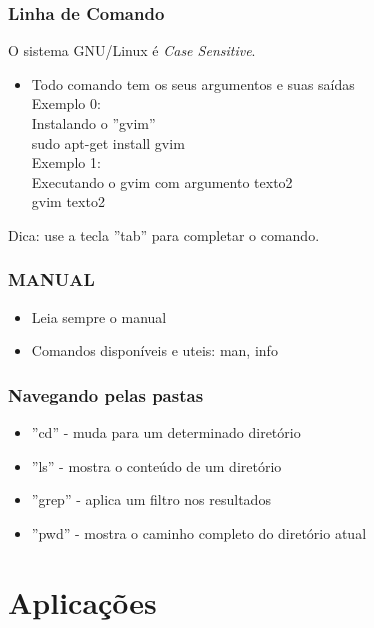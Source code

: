 \documentclass{beamer}
\begin{document}
\begin{frame}   
    \frametitle{Linha de Comando}

    O sistema GNU/Linux é \textit{Case Sensitive}.

    \begin{itemize}
        \item Todo comando tem os seus argumentos e suas saídas\\
            Exemplo 0:\\
            Instalando o ''gvim''\\
            sudo apt-get install gvim\\
            Exemplo 1: \\
            Executando o gvim com argumento texto2 \\
            gvim texto2 \\
    \end{itemize}

    Dica: use a tecla ''tab'' para completar o comando.

\end{frame}

\begin{frame}
    \frametitle{MANUAL}
    
    \begin{itemize}
        \item Leia sempre o manual
        \item Comandos disponíveis e uteis: man, info
    \end{itemize}

\end{frame}

\begin{frame}
    \frametitle{Navegando pelas pastas}

    \begin{itemize}
        \item ''cd'' - muda para um determinado diretório
        \item ''ls'' - mostra o conteúdo de um diretório
        \item ''grep'' - aplica um filtro nos resultados
        \item ''pwd'' - mostra o caminho completo do diretório atual
    \end{itemize}
\end{frame}


\section{Aplicações}
\end{document}

